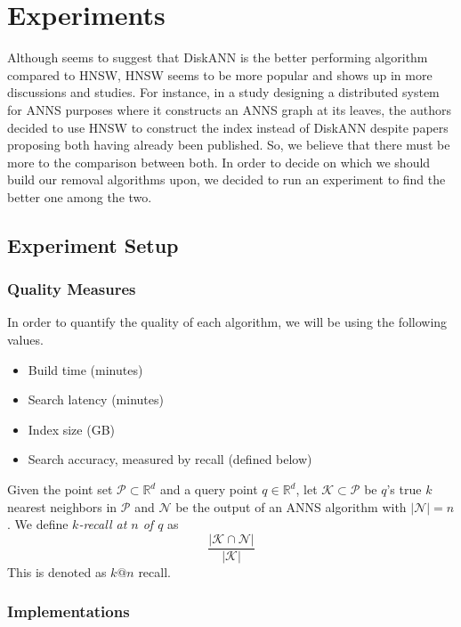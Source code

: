 \chapter{Experiments}

Although \cite{annscaling} seems to suggest that DiskANN is the better performing algorithm compared to HNSW, HNSW seems to be more popular and shows up in more discussions and studies. For instance, in a study designing a distributed system for ANNS purposes \cite{lanns} where it constructs an ANNS graph at its leaves, the authors decided to use HNSW to construct the index instead of DiskANN despite papers proposing both having already been published. So, we believe that there must be more to the comparison between both. In order to decide on which we should build our removal algorithms upon, we decided to run an experiment to find the better one among the two.

\section{Experiment Setup}

\subsection{Quality Measures}

In order to quantify the quality of each algorithm, we will be using the following values.
\begin{itemize}
    \item Build time (minutes)
    \item Search latency (minutes)
    \item Index size (GB)
    \item Search accuracy, measured by recall (defined below)
\end{itemize}

\begin{definition}[Recall]
    Given the point set \(\mathcal{P} \subset \mathbb{R}^d\) and a query point \(q \in \mathbb{R}^d\), let \(\mathcal{K} \subset \mathcal{P}\) be \(q\)'s true \(k\) nearest neighbors in \(\mathcal{P}\) and \(\mathcal{N}\) be the output of an ANNS algorithm with \(|\mathcal{N}| = n\). We define \textit{\(k\)-recall at \(n\) of \(q\)} as
    \[
        \frac{|\mathcal{K} \cap \mathcal{N}|}{|\mathcal{K}|}
    \]
    This is denoted as \(k@n\) recall.
\end{definition}
 
\subsection{Implementations}


